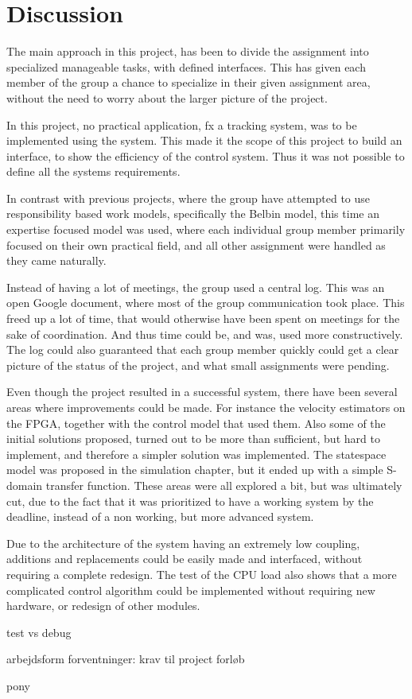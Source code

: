 \chapter{Discussion}\label{chap:discussion}
The main approach in this project, has been to divide the assignment into specialized manageable tasks, with defined interfaces.  This has given each member of the group a chance to specialize in their given assignment area, without the need to worry about the larger picture of the project.

In this project, no practical application, fx a tracking system, was to be implemented using the system.
This made it the scope of this project to build an interface, to show the efficiency of the control system. Thus it was not possible to define all the systems requirements.

In contrast with previous projects, where the group have attempted to use responsibility based work models, specifically the Belbin model, this time an expertise focused model was used, where each individual group member primarily focused on their own practical field, and all other assignment were handled as they came naturally. 

Instead of having a lot of meetings, the group used a central log. This was an open Google document, where most of the  group communication took place. This freed up a lot of time, that would otherwise have been spent on meetings for the sake of coordination. And thus time could be, and was, used more constructively. The log could also guaranteed that each group member quickly could get a clear picture of the status of the project, and what small assignments were pending.

Even though the project resulted in a successful system, there have been several areas where improvements could be made. For instance the velocity estimators on the FPGA, together with the control model that used them.
Also some of the initial solutions proposed, turned out to be more than sufficient, but hard to implement, and therefore a simpler solution was implemented. The statespace model was proposed in the simulation chapter, but it ended up with a simple S-domain transfer function. These areas were all explored a bit, but was ultimately cut, due to the fact that it was prioritized to have a working system by the deadline, instead of a non working, but more advanced system.

Due to the architecture of the system having an extremely low coupling, additions and replacements could be easily made and interfaced, without requiring a complete redesign. The test of the CPU load also shows that a more complicated control algorithm could be implemented without requiring new hardware, or redesign of other modules.

test vs debug

arbejdsform
	forventninger: krav til 
	project forløb


pony
